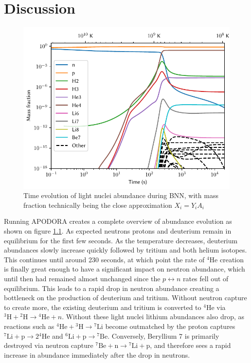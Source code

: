 \chapter{Discussion}
\label{chap:Results}
\begin{figure}[ht]
    \includegraphics[width=5.1in]{figures/abundancelight.pdf}
    \caption{Time evolution of light nuclei abundance during BNN, with mass fraction technically being the close approximation $X_i=Y_i A_i$ }
    \label{fig:lightXevo}
\end{figure}
Running APODORA creates a complete overview of abundance evolution as shown on figure \ref{fig:lightXevo}. As expected neutrons protons and deuterium remain in equilibrium for the first few seconds. As the temperature decreases, deuterium abundances slowly increase quickly followed by tritium and both helium isotopes. %
This continues until around 230 seconds, at which point the rate of ${}^4$He creation is finally great enough to have a significant impact on neutron abundance, which until then had remained almost unchanged since the $p\leftrightarrow n$ rates fell out of equilibrium. This leads to a rapid drop in neutron abundance creating a bottleneck on the production of deuterium and tritium. Without neutron capture to create more, the existing deuterium and tritium is converted to ${}^4$He via ${}^3\text{H}+{}^2\text{H}\rightarrow {}^4\text{He}+n$. Without these light nuclei lithium abundances also drop, as reactions such as ${}^4\text{He}+{}^3\text{H}\rightarrow {}^7\text{Li}$ become outmatched by the proton captures ${}^7\text{Li}+\text{p}\rightarrow 2{}^4\text{He}$ and ${}^6\text{Li}+\text{p}\rightarrow {}^7\text{Be}$. Conversely, Beryllium 7 is primarily destroyed via neutron capture ${}^7\text{Be}+\text{n}\rightarrow {}^7\text{Li}+\text{p}$, and therefore sees a rapid increase in abundance immediately after the drop in neutrons.
